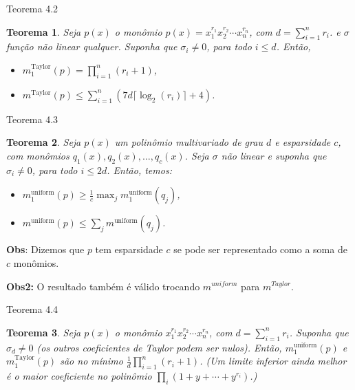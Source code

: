 \documentclass{beamer}
\newtheorem{teo}{Teorema}[section]
\theoremstyle{definition}
\begin{document}
\begin{frame}{Teorema 4.2}
    
    \begin{teo}
        Seja $p(x)$ o monômio $p(x) = x_1^{r_1} x_2^{r_2} \cdots x_n^{r_n}$, com $d = \sum_{i=1}^{n} r_i$. e $\sigma$ função não linear qualquer. Suponha que $\sigma_i \neq 0$, para todo $i\leq d$. Então,
        \begin{itemize}
          \item[(i)] $m_1^{\text{Taylor}}(p) = \prod_{i=1}^{n}(r_i + 1)$,
          \item[(ii)] $m^{\text{Taylor}}(p) \leq \sum_{i=1}^{n} \left(7d\lceil \log_2(r_i) \rceil + 4\right)$.
        \end{itemize}
    
    \end{teo}
\end{frame}

\begin{frame}{Teorema 4.3}
    \begin{teo}
        Seja $p(x)$ um polinômio multivariado de grau $d$ e esparsidade $c$, com monômios $q_1(x), q_2(x), \dots, q_c(x)$. Seja $\sigma$ não linear e suponha que $\sigma_i \neq 0$, para todo $i\leq 2d$. Então, temos:
        \begin{itemize}
        \item[(i)] $m_1^{\text{uniform}}(p) \geq \frac{1}{c} \max_j m_1^{\text{uniform}}(q_j)$,
        \item[(ii)] $m^{\text{uniform}}(p) \leq \sum_j m^{\text{uniform}}(q_j)$.
        \end{itemize}

    \end{teo}
    
    \pause \textbf{Obs}: Dizemos que $p$ tem esparsidade $c$ se pode ser representado como a soma de $c$ monômios. 
    
    \pause \textbf{Obs2:} O resultado também é válido trocando $m^{uniform}$ para $m^{Taylor}$.
\end{frame}

\begin{frame}{Teorema 4.4}
    \begin{teo}
        Seja $p(x)$ o monômio $x_1^{r_1} x_2^{r_2} \cdots x_n^{r_n}$, com $d = \sum_{i=1}^{n} r_i$. Suponha que $\sigma_d \neq 0$ (os outros coeficientes de Taylor podem ser nulos). Então, $m_1^{\text{uniform}}(p)$ e $m_1^{\text{Taylor}}(p)$ são no mínimo $\frac{1}{d} \prod_{i=1}^{n}(r_i + 1)$. (Um limite inferior ainda melhor é o maior coeficiente no polinômio $\prod_i (1 + y + \cdots + y^{r_i})$.)
    \end{teo}
\end{frame}
\end{document}
